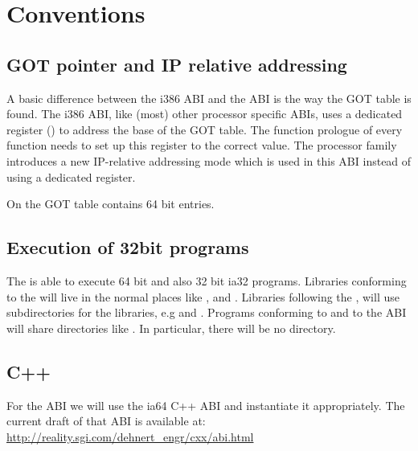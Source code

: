 \chapter{Conventions}



\section{GOT pointer and IP relative addressing}

A basic difference between the i386 ABI and the \xARCH ABI is the
way the GOT table is found.  The i386 ABI, like (most) other processor
specific ABIs, uses a dedicated register () to address the
base of the GOT table.  The function prologue of every function needs
to set up this register to the correct value.  The \xARCH processor
family introduces a new IP-relative addressing mode which is used in
this ABI instead of using a dedicated register.

On \xARCH the GOT table contains 64 bit entries.

\section{Execution of 32bit programs}


The \xARCH is able to execute 64 bit \xARCH and also 32 bit ia32
programs.  Libraries conforming to the \intelabi will live in the
normal places like ,  and .
Libraries following the \xARCH, will use  subdirectories
for the libraries, e.g  and .  Programs
conforming to \intelabi and to the \xARCH ABI will share directories
like .  In particular, there will be no 
directory.

\section{C++\label{section-cpp}}

For the  ABI we will use the ia64 C++ ABI and instantiate it
appropriately.  The current draft of that ABI is available at:\\
\url{http://reality.sgi.com/dehnert_engr/cxx/abi.html}


